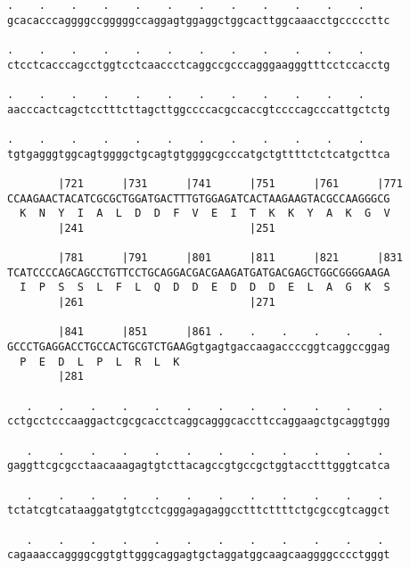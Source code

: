 \documentclass{article}
\begin{document}
\begin{Verbatim}
.    .    .    .    .    .    .    .    .    .    .    .    
gcacacccaggggccgggggccaggagtggaggctggcacttggcaaacctgcccccttc
                                                            
.    .    .    .    .    .    .    .    .    .    .    .    
ctcctcacccagcctggtcctcaaccctcaggccgcccagggaagggtttcctccacctg
                                                            
.    .    .    .    .    .    .    .    .    .    .    .    
aacccactcagctcctttcttagcttggccccacgccaccgtccccagcccattgctctg
                                                            
.    .    .    .    .    .    .    .    .    .    .    .    
tgtgagggtggcagtggggctgcagtgtggggcgcccatgctgttttctctcatgcttca
                                                            
        |721      |731      |741      |751      |761      |771
CCAAGAACTACATCGCGCTGGATGACTTTGTGGAGATCACTAAGAAGTACGCCAAGGGCG
  K  N  Y  I  A  L  D  D  F  V  E  I  T  K  K  Y  A  K  G  V
        |241                          |251                  
  
        |781      |791      |801      |811      |821      |831
TCATCCCCAGCAGCCTGTTCCTGCAGGACGACGAAGATGATGACGAGCTGGCGGGGAAGA
  I  P  S  S  L  F  L  Q  D  D  E  D  D  D  E  L  A  G  K  S
        |261                          |271                  
  
        |841      |851      |861 .    .    .    .    .    . 
GCCCTGAGGACCTGCCACTGCGTCTGAAGgtgagtgaccaagaccccggtcaggccggag
  P  E  D  L  P  L  R  L  K                                 
        |281                                                
  
   .    .    .    .    .    .    .    .    .    .    .    . 
cctgcctcccaaggactcgcgcacctcaggcagggcaccttccaggaagctgcaggtggg
                                                            
   .    .    .    .    .    .    .    .    .    .    .    . 
gaggttcgcgcctaacaaagagtgtcttacagccgtgccgctggtacctttgggtcatca
                                                            
   .    .    .    .    .    .    .    .    .    .    .    . 
tctatcgtcataaggatgtgtcctcgggagagaggcctttcttttctgcgccgtcaggct
                                                            
   .    .    .    .    .    .    .    .    .    .    .    . 
cagaaaccaggggcggtgttgggcaggagtgctaggatggcaagcaaggggcccctgggt
                                                            

\end{Verbatim}
\end{document}
